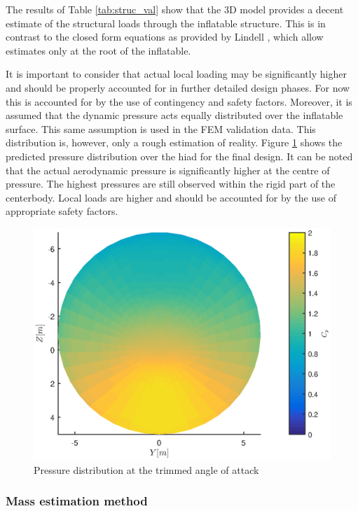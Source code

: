 The results of Table \ref{tab:struc_val} show that the 3D model provides a decent estimate of the structural loads through the inflatable structure. This is in contrast to the closed form equations as provided by Lindell \cite{Lindell2006}, which allow estimates only at the root of the inflatable. 

It is important to consider that actual local loading may be significantly higher and should be properly accounted for in further detailed design phases. For now this is accounted for by the use of contingency and safety factors. Moreover, it is assumed that the dynamic pressure acts equally distributed over the inflatable surface. This same assumption is used in the FEM validation data. This distribution is, however, only a rough estimation of reality. Figure \ref{fig:struc_pres} shows the predicted pressure distribution over the \gls{hiad} for the final design. It can be noted that the actual aerodynamic pressure is significantly higher at the centre of pressure. The highest pressures are still observed within the rigid part of the centerbody. Local loads are higher and should be accounted for by the use of appropriate safety factors.

\begin{figure}[h]
\centering
\includegraphics[width=1\textwidth]{./Figure/Structure/FrontviewCpDist}
\caption{Pressure distribution at the trimmed angle of attack} 
\label{fig:struc_pres}
\end{figure}

\subsubsection{Mass estimation method}

